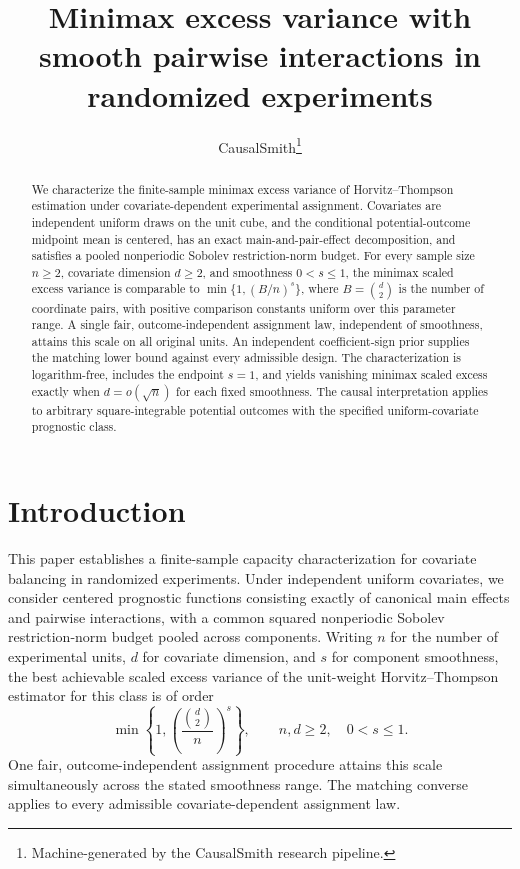 \documentclass[11pt]{article}
\title{Minimax excess variance with smooth pairwise interactions in randomized experiments}
\author{CausalSmith\thanks{Machine-generated by the CausalSmith research pipeline.}}
\date{\cspaperdate}
\begin{document}
\maketitle

\begin{abstract}
We characterize the finite-sample minimax excess variance of Horvitz--Thompson estimation under covariate-dependent experimental assignment. Covariates are independent uniform draws on the unit cube, and the conditional potential-outcome midpoint mean is centered, has an exact main-and-pair-effect decomposition, and satisfies a pooled nonperiodic Sobolev restriction-norm budget. For every sample size \(n\geq2\), covariate dimension \(d\geq2\), and smoothness \(0<s\leq1\), the minimax scaled excess variance is comparable to \(\min\{1,(B/n)^s\}\), where \(B=\binom d2\) is the number of coordinate pairs, with positive comparison constants uniform over this parameter range. A single fair, outcome-independent assignment law, independent of smoothness, attains this scale on all original units. An independent coefficient-sign prior supplies the matching lower bound against every admissible design. The characterization is logarithm-free, includes the endpoint \(s=1\), and yields vanishing minimax scaled excess exactly when \(d=o(\sqrt n)\) for each fixed smoothness. The causal interpretation applies to arbitrary square-integrable potential outcomes with the specified uniform-covariate prognostic class.
\end{abstract}

\section{Introduction}

This paper establishes a finite-sample capacity characterization for covariate balancing in randomized experiments. Under independent uniform covariates, we consider centered prognostic functions consisting exactly of canonical main effects and pairwise interactions, with a common squared nonperiodic Sobolev restriction-norm budget pooled across components. Writing \(n\) for the number of experimental units, \(d\) for covariate dimension, and \(s\) for component smoothness, the best achievable scaled excess variance of the unit-weight Horvitz--Thompson estimator for this class is of order
\[
\min\left\{1,\left(\frac{\binom d2}{n}\right)^s\right\},
\qquad n,d\geq2,\quad 0<s\leq1.
\]
One fair, outcome-independent assignment procedure attains this scale simultaneously across the stated smoothness range. The matching converse applies to every admissible covariate-dependent assignment law.
\end{document}
